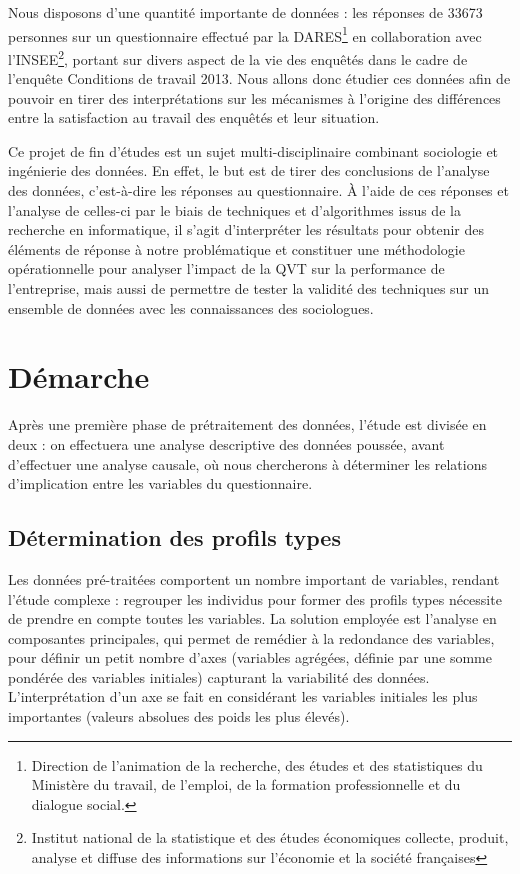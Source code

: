 \documentclass[11pt,fleqn,openany,frenchb]{book} %
\begin{document}
Nous disposons d'une quantité importante de données : les réponses de 33673 personnes sur un questionnaire effectué par la DARES\footnote{Direction de l'animation de la recherche, des études et des statistiques du Ministère du travail, de l'emploi, de la formation professionnelle et du dialogue social.} en collaboration avec l'INSEE\footnote{Institut national de la statistique et des études économiques collecte, produit, analyse et diffuse des informations sur l'économie et la société françaises}, portant sur divers aspect de la vie des enquêtés dans le cadre de l'enquête Conditions de travail 2013. Nous allons donc étudier ces données afin de pouvoir en tirer des interprétations sur les mécanismes à l'origine des différences entre la satisfaction au travail des enquêtés et leur situation.\par

Ce projet de fin d'études est un sujet multi-disciplinaire combinant sociologie et ingénierie des données. En effet, le but est de tirer des conclusions de l'analyse des données, c'est-à-dire les réponses au questionnaire. \`A l'aide de ces réponses et l'analyse de celles-ci par le biais de techniques et d'algorithmes issus de la recherche en informatique, il s'agit d'interpréter les résultats pour obtenir des éléments de réponse à notre problématique et constituer une  méthodologie opérationnelle pour analyser l'impact de la QVT sur la performance de l'entreprise, mais aussi de permettre de tester la validité des techniques sur un ensemble de données avec les connaissances des sociologues.\par


\section{Démarche}
Après une première phase de prétraitement des données, l'étude est
divisée en deux : on effectuera une analyse descriptive des données
poussée, avant d'effectuer une analyse causale, où nous chercherons à
déterminer les relations d'implication entre les variables du
questionnaire.\par

\subsection{Détermination des profils types}
Les données pré-traitées comportent un nombre important de variables,
rendant l'étude complexe : regrouper les individus pour former des
profils types nécessite de prendre en compte toutes les variables. La
solution employée est l'analyse en composantes principales, qui permet
de remédier à la redondance des variables, pour définir un petit
nombre d'axes (variables agrégées, définie par une somme pondérée des
variables initiales) capturant la variabilité des
données. L'interprétation d'un axe se fait en considérant les
variables initiales les plus importantes (valeurs absolues des poids
les plus élevés). \par
\end{document}
